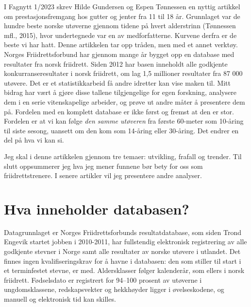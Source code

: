 
\lettrine[lines=3]{I}{} Fagnytt 1/2023 skrev Hilde Gundersen og Espen Tønnessen en nyttig artikkel
om prestasjonsfremgang hos gutter og jenter fra 11 til 18 år. Grunnlaget var
de hundre beste norske utøverne gjennom tidene på hvert alderstrinn
(Tønnessen mfl., 2015), hvor undertegnede var en av medforfatterne. Kurvene derfra er de beste vi har hatt. Denne artikkelen tar opp tråden, men
med et annet verktøy. Norges Friidrettsforbund har gjennom mange år bygget
opp en database med resultater fra norsk friidrett. Siden 2012 har basen inneholdt alle godkjente konkurranseresultater i norsk friidrett, om lag 1,5 millioner resultater fra 87 000 utøvere. Det er et
statistikkarbeid få andre idretter kan vise maken til. Mitt bidrag har vært
å gjøre disse tallene tilgjengelige for egen forskning, analysere dem i en
serie vitenskapelige arbeider, og prøve ut andre måter å presentere dem på.
Fordelen med en komplett database er ikke først og fremst at den er stor.
Fordelen er at vi kan følge \emph{den samme utøveren} fra første 60-meter som
10-åring til siste sesong, uansett om den kom som 14-åring eller 30-åring.
Det endrer en del på hva vi kan si.

Jeg skal i denne artikkelen gjennom tre temaer: utvikling, frafall og trender. Til slutt
oppsummerer jeg hva jeg mener funnene bør bety for oss som friidrettstrenere. I senere artikler vil jeg presentere andre analyser.

\section{Hva inneholder databasen?}\label{hva-inneholder-databasen}

Datagrunnlaget er Norges Friidrettsforbunds resultatdatabase, som siden Trond Engevik startet jobben i 2010-2011, har fullstendig elektronisk registrering av alle godkjente stevner i Norge samt alle resultater av norske utøvere i utlandet. Det finnes ingen
kvalifiseringskrav for å havne i databasen: den som stiller til start i et
terminfestet stevne, er med. Aldersklasser følger kalenderår, som ellers i
norsk friidrett. Fødselsdato er registrert for 94--100 prosent av utøverne i
ungdomsklassene, redskapsvekter og hekkhøyder ligger i øvelseskodene, og
manuell og elektronisk tid kan skilles.

